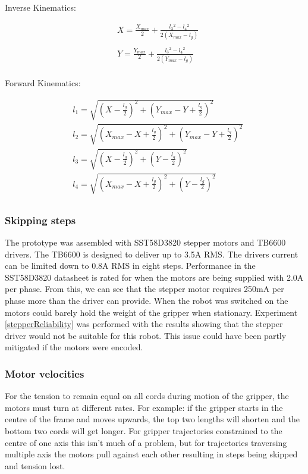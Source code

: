 \documentclass[conference]{IEEEtran}
\begin{document}
Inverse Kinematics:

\begin{equation}
\begin{aligned}
&X = \frac{X_{max}}{2} + \frac{l_3{}^2 - l_4{}^2}{2\left(X_{max} - l_g\right)}\\ \\
&Y = \frac{Y_{max}}{2} + \frac{l_3{}^2 - l_4{}^2}{2\left(Y_{max} - l_g\right)}\\
\end{aligned}
\end{equation}

Forward Kinematics:

\begin{equation}
\begin{aligned}
&l_1 = \sqrt{\left(X - \frac{l_g}{2}\right)^2 + \left(Y_{max}-Y+\frac{l_g}{2}\right)^2}\\
&l_2 = \sqrt{\left(X_{max}-X+\frac{l_g}{2}\right)^2 + \left(Y_{max}-Y+\frac{l_g}{2}\right)^2}\\
&l_3 = \sqrt{\left(X-\frac{l_g}{2}\right)^2 + \left(Y-\frac{l_g}{2}\right)^2}\\
&l_4 = \sqrt{\left(X_{max}-X+\frac{l_g}{2}\right)^2 + \left(Y-\frac{l_g}{2}\right)^2}\\
\end{aligned}
\end{equation}
\subsubsection{Skipping steps}\label{motor_issues}
The prototype was assembled with SST58D3820 stepper motors and TB6600 drivers. The TB6600 is designed to deliver up to 3.5A RMS. The drivers current can be limited down to 0.8A RMS in eight steps. Performance in the SST58D3820 datasheet is rated for when the motors are being supplied with 2.0A per phase. From this, we can see that the stepper motor requires 250mA per phase more than the driver can provide. When the robot was switched on the motors could barely hold the weight of the gripper when stationary. Experiment \ref{stepperReliability} was performed with the results showing that the stepper driver would not be suitable for this robot. This issue could have been partly mitigated if the motors were encoded.\subsubsection{Motor velocities}\label{motor_vel_problem}For the tension to remain equal on all cords during motion of the gripper, the motors must turn at different rates. For example: if the gripper starts in the centre of the frame and moves upwards, the top two lengths will shorten and the bottom two cords will get longer. For gripper trajectories constrained to the centre of one axis this isn't much of a problem, but for trajectories traversing multiple axis the motors pull against each other resulting in steps being skipped and tension lost.
\end{document}
